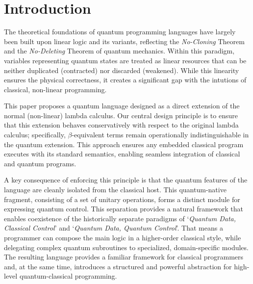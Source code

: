 \section{Introduction} \label{sec:intro}
The theoretical foundations of quantum programming languages have largely been built upon linear logic and its variants\cite{VANTONDER2004_LambdaCalculusQuantum,SELINGER2009_QuantumLambdaCalculus,ALTENKIRCH2005_FunctionalQuantumProgramming,SABRY2018_SymmetricPatternMatchingQuantum,ROSS2017_AlgebraicLogicalMethods}, reflecting the \textit{No-Cloning} Theorem\cite{WOOTTERS1982_SingleQuantumCannota} and the \textit{No-Deleting} Theorem\cite{KUMARPATI2000_ImpossibilityDeletingUnknowna} of quantum mechanics.
Within this paradigm, variables representing quantum states are treated as linear resources that can be neither duplicated (contracted) nor discarded (weakened).
While this linearity ensures the physical correctness, it creates a significant gap with the intutions of classical, non-linear programming.

This paper proposes a quantum language designed as a direct extension of the normal (non-linear) lambda calculus.
Our central design principle is to ensure that this extension behaves conservatively with respect to the original lambda calculus; specifically, $\beta$-equivalent terms remain operationally indistinguishable in the quantum extension.
This approach ensures any embedded classical program executes with its standard semantics, enabling seamless integration of classical and quantum programs.

A key consequence of enforcing this principle is that the quantum features of the language are cleanly isolated from the classical host.
This quantum-native fragment, consisting of a set of unitary operations, forms a distinct module for expressing quantum control.
This separation provides a natural framework that enables coexistence of the historically separate paradigms of `\textit{Quantum Data, Classical Control}'\cite{SELINGER2004_QuantumProgrammingLanguage} and `\textit{Quantum Data, Quantum Control}'\cite{DÍAZ-CARO2022_QuickOverviewQuantum}.
That means a programmer can compose the main logic in a higher-order classical style, while delegating complex quantum subroutines to specialized, domain-specific modules.
The resulting language provides a familiar framework for classical programmers and, at the same time, introduces a structured and powerful abstraction for high-level quantum-classical programming.
